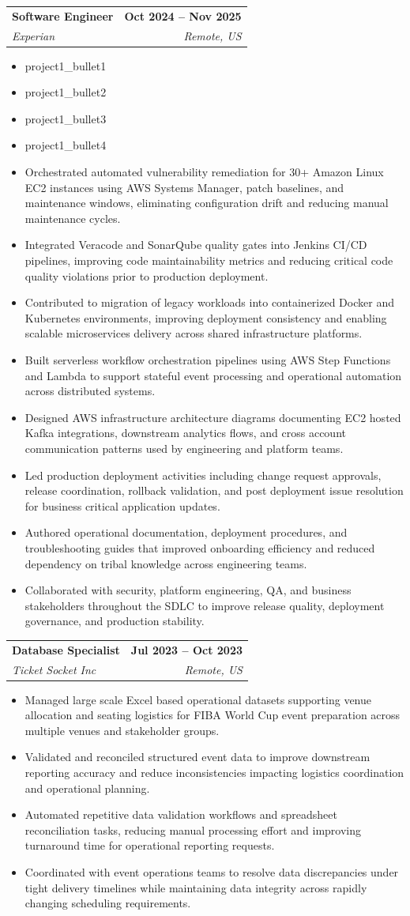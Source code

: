 \documentclass[letterpaper,10pt]{article}
\makeatletter
\newcommand{\resumeItem}[1]{
  \item\small{#1}\vspace{-2pt}
}
\newcommand{\resumeSubheading}[4]{
  \vspace{-1pt}\item
    \begin{tabular*}{1.0\textwidth}[t]{l@{\extracolsep{\fill}}r}
      \textbf{#1} & \textbf{\small #2} \\
      \textit{\small#3} & \textit{\small #4} \\
    \end{tabular*}\vspace{-7pt}
}
\newcommand{\resumeItemListStart}{\begin{itemize}[leftmargin=0.15in]}
\newcommand{\resumeItemListEnd}{\end{itemize}\vspace{-5pt}}
\makeatother
\begin{document}
    \resumeSubheading
      {Software Engineer}{Oct 2024 -- Nov 2025}
      {Experian}{Remote, US}
      \resumeItemListStart
        \resumeItem{{{project1_bullet1}}}
        \resumeItem{{{project1_bullet2}}}
        \resumeItem{{{project1_bullet3}}}
        \resumeItem{{{project1_bullet4}}}
        \resumeItem{Orchestrated automated vulnerability remediation for 30+ Amazon Linux EC2 instances using AWS Systems Manager, patch baselines, and maintenance windows, eliminating configuration drift and reducing manual maintenance cycles.}
        \resumeItem{Integrated Veracode and SonarQube quality gates into Jenkins CI/CD pipelines, improving code maintainability metrics and reducing critical code quality violations prior to production deployment.}
        \resumeItem{Contributed to migration of legacy workloads into containerized Docker and Kubernetes environments, improving deployment consistency and enabling scalable microservices delivery across shared infrastructure platforms.}
        \resumeItem{Built serverless workflow orchestration pipelines using AWS Step Functions and Lambda to support stateful event processing and operational automation across distributed systems.}
        \resumeItem{Designed AWS infrastructure architecture diagrams documenting EC2 hosted Kafka integrations, downstream analytics flows, and cross account communication patterns used by engineering and platform teams.}
        \resumeItem{Led production deployment activities including change request approvals, release coordination, rollback validation, and post deployment issue resolution for business critical application updates.}
        \resumeItem{Authored operational documentation, deployment procedures, and troubleshooting guides that improved onboarding efficiency and reduced dependency on tribal knowledge across engineering teams.}
        \resumeItem{Collaborated with security, platform engineering, QA, and business stakeholders throughout the SDLC to improve release quality, deployment governance, and production stability.}
      \resumeItemListEnd

    \resumeSubheading
      {Database Specialist}{Jul 2023 -- Oct 2023}
      {Ticket Socket Inc}{Remote, US}
      \resumeItemListStart
        \resumeItem{Managed large scale Excel based operational datasets supporting venue allocation and seating logistics for FIBA World Cup event preparation across multiple venues and stakeholder groups.}
        \resumeItem{Validated and reconciled structured event data to improve downstream reporting accuracy and reduce inconsistencies impacting logistics coordination and operational planning.}
        \resumeItem{Automated repetitive data validation workflows and spreadsheet reconciliation tasks, reducing manual processing effort and improving turnaround time for operational reporting requests.}
        \resumeItem{Coordinated with event operations teams to resolve data discrepancies under tight delivery timelines while maintaining data integrity across rapidly changing scheduling requirements.}
      \resumeItemListEnd
\end{document}
